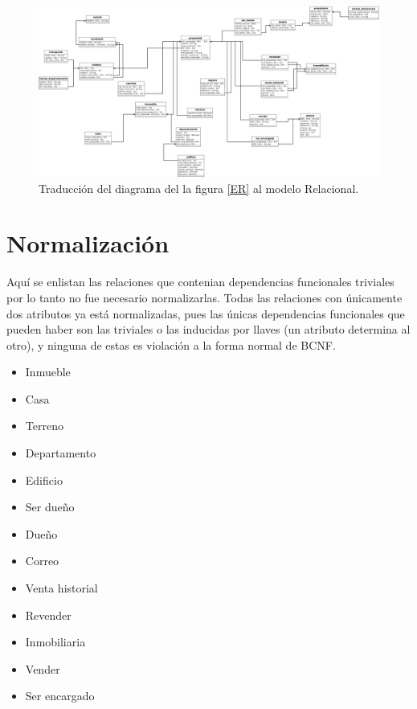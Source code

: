 \documentclass[10pt]{article}
\begin{document}
    \begin{center}
    	\begin{figure}[H]
    		\centering
    		\includegraphics[width=1 \textwidth]{modeloRelacional.jpeg}
    		\caption{Traducción del diagrama del la figura \ref{ER} al modelo Relacional.}
    		\label{MR}
    	\end{figure}
    \end{center}

    \section{Normalización}
    
    Aquí se enlistan las relaciones que contenian dependencias funcionales triviales por lo tanto no fue necesario normalizarlas. 
    Todas las relaciones con únicamente dos atributos ya está normalizadas, pues las
    únicas dependencias funcionales que pueden haber son las triviales o las inducidas
    por llaves (un atributo determina al otro), y ninguna de estas es violación a la forma normal de BCNF.
    \begin{itemize}
    	\item Inmueble
    	\item Casa
    	\item Terreno
    	\item Departamento
    	\item Edificio
    	\item Ser dueño
    	\item Dueño
    	\item Correo 
    	\item Venta historial
    	\item Revender
    	\item Inmobiliaria
    	\item Vender
    	\item Ser encargado
    \end{itemize}
    
\end{document}
